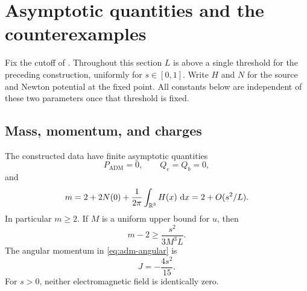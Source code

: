 \section{Asymptotic quantities and the counterexamples}
\label{sec:counterexamples}

Fix the cutoff of . Throughout this section \(L\)
is above a single threshold for the preceding construction, uniformly for
\(s\in[0,1]\). Write \(H\) and \(N\) for the source and Newton potential
at the fixed point. All constants below are independent of these two
parameters once that threshold is fixed.

\subsection{Mass, momentum, and charges}

\begin{proposition}\label{prop:charges}
The constructed data have finite asymptotic quantities
\begin{equation}\label{eq:vanishing-charges}
 P_{\mathrm{ADM}}=0,\qquad Q_e=Q_b=0,
\end{equation}
and
\begin{equation}\label{eq:mass}
 m=2+2N(0)+\frac1{2\pi}\int_{\mathbb R^3}H(x)\,\mathop{}\!\mathrm d x
   =2+O(s^2/L).
\end{equation}
In particular \(m\ge2\). If \(M\) is a uniform upper bound for \(u\), then
\begin{equation}\label{eq:mass-lower-bound}
 m-2\ge\frac{s^2}{3M^3L}.
\end{equation}
The angular momentum in \eqref{eq:adm-angular} is
\begin{equation}\label{eq:angular-momentum}
 J=-\frac{4s^2}{15}.
\end{equation}
For \(s>0\), neither electromagnetic field is identically zero.
\end{proposition}

